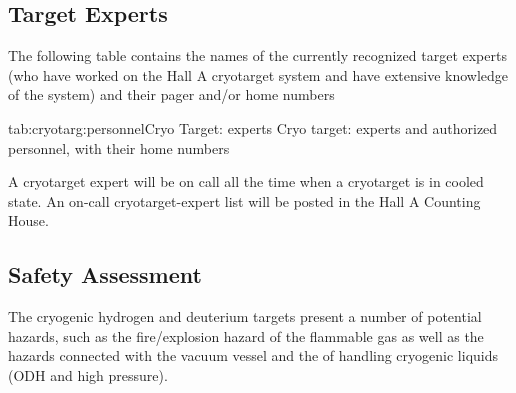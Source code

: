\vspace{0.3cm}


\begin{safetyen}{10}{10}
\section{Target Experts}
\end{safetyen}

The following table contains the names of the currently recognized target 
experts (who have worked on the Hall A cryotarget system and
have extensive knowledge of the system)
and their pager and/or home numbers

\begin{namestab}{tab:cryotarg:personnel}{Cryo Target: experts}{%
   Cryo target: experts and authorized personnel, with their home numbers}
\end{namestab}

\par
A cryotarget expert will be on call all the time when
a cryotarget is in cooled state.
An on-call cryotarget-expert list will be posted in the 
Hall A Counting House. 



\begin{safetyen}{10}{5}
\section{Safety Assessment}
\label{sec:target-cryo-safety}

The cryogenic hydrogen and deuterium targets present a number of potential
hazards, such as the
fire/explosion hazard of the flammable gas as well as the hazards
connected with
the vacuum vessel and the of handling cryogenic liquids
(ODH and high pressure). 
\end{safetyen}

